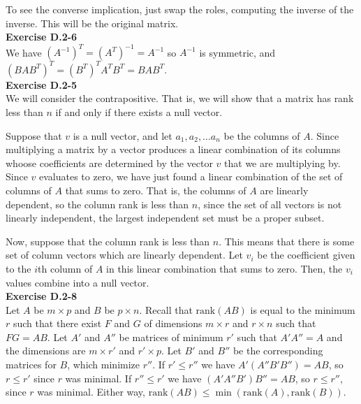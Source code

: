 \documentclass{article}
\newcommand{\rank}{\mbox{rank}}
\begin{document}
To see the converse implication, just swap the roles, computing the inverse of the inverse. This will be the original matrix.\\


\noindent\textbf{Exercise D.2-6}\\

We have $(A^{-1})^T = (A^T)^{-1} = A^{-1}$ so $A^{-1}$ is symmetric, and $(BAB^T)^T = (B^T)^TA^TB^T = BAB^T$.   \\

\noindent\textbf{Exercise D.2-5}\\

We will consider the contrapositive. That is, we will show that a matrix has rank less than $n$ if and only if there exists a null vector.

Suppose that $v$ is a null vector, and let $a_1,a_2,\ldots a_n$ be the columns of $A$. Since multiplying a matrix by a vector produces a linear combination of its columns whoose coefficients are determined by the vector $v$ that we are multiplying by. Since $v$ evaluates to zero, we have just found a linear combination of the set of columns of $A$ that sums to zero. That is, the columns of $A$ are linearly dependent, so the column rank is less than $n$, since the set of all vectors is not linearly independent, the largest independent set must be a proper subset.

Now, suppose that the column rank is less than $n$. This means that there is some set of column vectors which are linearly dependent. Let $v_i$ be the coefficient given to the $i$th column of $A$ in this linear combination that sums to zero. Then, the $v_i$ values combine into a null vector.\\


\noindent\textbf{Exercise D.2-8}\\

Let $A$ be $m \times p$ and $B$ be $p \times n$.  Recall that $\rank(AB)$ is equal to the minimum $r$ such that there exist $F$ and $G$ of dimensions $m \times r$ and $r \times n$ such that $FG = AB$. Let $A'$ and $A''$ be matrices of minimum $r'$ such that $A'A'' = A$ and the dimensions are $m \times r'$ and $r' \times p$.  Let $B'$ and $B''$ be the corresponding matrices for $B$, which minimize $r''$.  If $r' \leq r''$ we have $A' (A''B'B'') = AB$, so $r \leq r'$ since $r$ was minimal.  If $r'' \leq r'$ we have $(A'A''B')B'' = AB$, so $r \leq r''$, since $r$ was minimal.  Either way, $\rank(AB) \leq \min(\rank(A), \rank(B))$.  
\end{document}
